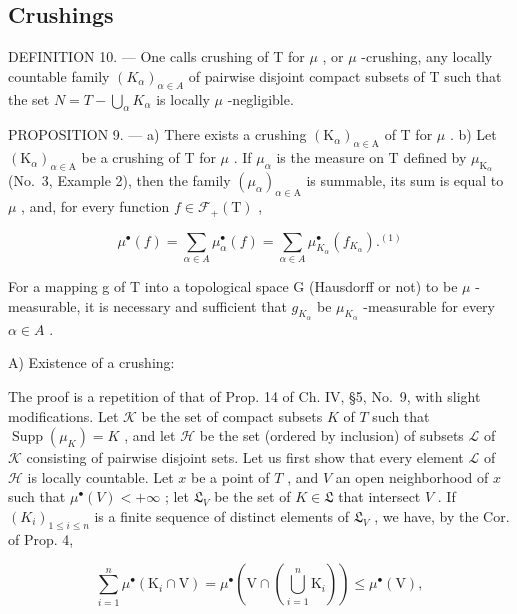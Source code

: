 \subsection{Crushings}

DEFINITION 10. --- One calls crushing of T for \(\mu\) , or \(\mu\) -crushing, any locally countable family \((K_{\alpha})_{\alpha \in A}\) of pairwise disjoint compact subsets of T such that the set \(N = T - \bigcup_{\alpha} K_{\alpha}\) is locally \(\mu\) -negligible.

PROPOSITION 9. --- a) There exists a crushing \((\mathrm{K}_{\alpha})_{\alpha \in \mathrm{A}}\) of T for \(\mu\) . b) Let \((\mathrm{K}_{\alpha})_{\alpha \in \mathrm{A}}\) be a crushing of T for \(\mu\) . If \(\mu_{\alpha}\) is the measure on T defined by \(\mu_{\mathrm{K}_{\alpha}}\) (No.~3, Example 2), then the family \((\mu_{\alpha})_{\alpha \in \mathrm{A}}\) is summable, its sum is equal to \(\mu\) , and, for every function \(f \in \mathcal{F}_{+}(\mathrm{T})\) ,

\[
\mu^ {\bullet} (f) = \sum_ {\alpha \in A} \mu_ {\alpha} ^ {\bullet} (f) = \sum_ {\alpha \in A} \mu_ {K _ {\alpha}} ^ {\bullet} (f _ {K _ {\alpha}}). ^ {(1)}\tag{7}
\]

For a mapping g of T into a topological space G (Hausdorff or not) to be \(\mu\) -measurable, it is necessary and sufficient that \(g_{K_{\alpha}}\) be \(\mu_{K_{\alpha}}\) -measurable for every \(\alpha \in A\) .

A) Existence of a crushing:

The proof is a repetition of that of Prop. 14 of Ch. IV, §5, No.~9, with slight modifications. Let \(\mathcal{K}\) be the set of compact subsets \(K\) of \(T\) such that \(\operatorname{Supp}(\mu_K) = K\) , and let \(\mathcal{H}\) be the set (ordered by inclusion) of subsets \(\mathcal{L}\) of \(\mathcal{K}\) consisting of pairwise disjoint sets. Let us first show that every element \(\mathcal{L}\) of \(\mathcal{H}\) is locally countable. Let \(x\) be a point of \(T\) , and \(V\) an open neighborhood of \(x\) such that \(\mu^\bullet(V) < +\infty\) ; let \(\mathfrak{L}_V\) be the set of \(K \in \mathfrak{L}\) that intersect \(V\) . If \((K_i)_{1 \leqslant i \leqslant n}\) is a finite sequence of distinct elements of \(\mathfrak{L}_V\) , we have, by the Cor. of Prop. 4,

\[
\sum_ {i = 1} ^ {n} \mu^ {\bullet} (\mathrm{K} _ {i} \cap \mathrm{V}) = \mu^ {\bullet} \left(\mathrm{V} \cap \left(\bigcup_ {i = 1} ^ {n} \mathrm{K} _ {i}\right)\right) \leqslant \mu^ {\bullet} (\mathrm{V}),
\]

